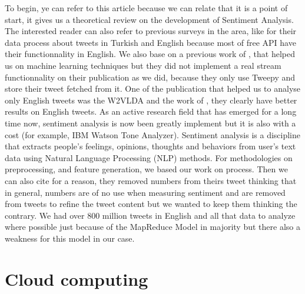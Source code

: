 \documentclass{acmtog} %
\begin{document}
To begin, ye can refer to this article \cite{Palpanas11} because we can relate that it is a point of start, it gives us a theoretical review on the development of Sentiment Analysis. The interested reader can also refer to previous surveys in the area, like \cite{Ayvazb17} for their data process about tweets in Turkish and English  because most of free API have their functionnality in English. We also base on a previous work of \cite{Badhani17}, that helped us on machine learning techniques but they did not implement a real stream functionnality on their publication as we did, because they only use Tweepy and store their tweet fetched from it. One of the publication that helped us to analyse only English tweets was the W2VLDA and the work of \cite{Cuadros17}, they clearly have better results on English tweets. As an active research field that has emerged for a long time now, sentiment analysis is now been greatly implement but it is also with a cost (for example, IBM Watson Tone Analyzer). Sentiment analysis is a discipline that extracts people’s feelings, opinions, thoughts and behaviors from user’s text data using Natural Language Processing (NLP) methods. For methodologies on preprocessing, and feature generation, we based our work on process. Then we can also cite for a reason, they removed numbers from theirs tweet thinking that in general, numbers are of no use when measuring sentiment and are removed from tweets to refine the tweet content but we wanted to keep them thinking the contrary. We had over 800 million tweets in English and all that data to analyze where possible just because of the MapReduce Model in majority but there also a weakness for this model in our case.

\section{Cloud computing}
\label{sec:cloud}
\end{document}
